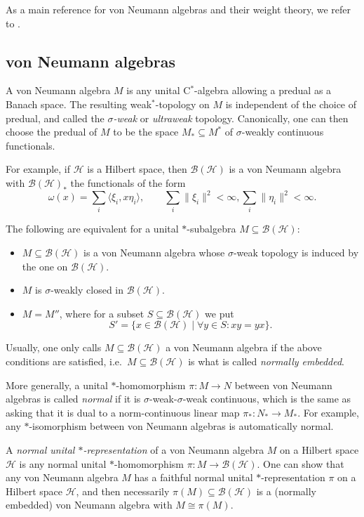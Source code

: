 \documentclass[11pt, reqno]{amsart}
\theoremstyle{definition}
\numberwithin{equation}{section}
\newcommand{\Hsp}{\mathcal{H}}
\newcommand{\Bc}{\mathcal{B}}
\begin{document}
As a main reference for von Neumann algebras and their weight theory, we refer to \cite{Tak02,Tak03}. 


\subsection{von Neumann algebras}

A von Neumann algebra $M$ is any unital C$^*$-algebra allowing a predual as a Banach space. The resulting weak$^*$-topology on $M$ is independent of the choice of predual, and called the \emph{$\sigma$-weak} or \emph{ultraweak} topology. Canonically, one can then choose the predual of $M$ to be the space $M_* \subseteq M^*$ of $\sigma$-weakly continuous functionals.

For example, if $\Hsp$ is a Hilbert space, then $\Bc(\Hsp)$ is a von Neumann algebra with $\Bc(\Hsp)_*$ the functionals of the form 
\[
\omega(x) = \sum_i \langle \xi_i,x\eta_i\rangle,\qquad \sum_i \|\xi_i\|^2 <\infty,\sum_i \|\eta_i\|^2 <\infty. 
\]

The following are equivalent for a unital $*$-subalgebra $M \subseteq \Bc(\Hsp)$: 
\begin{itemize}
\item $M \subseteq \Bc(\Hsp)$ is a von Neumann algebra whose $\sigma$-weak topology is induced by the one on $\Bc(\Hsp)$.
\item $M$ is $\sigma$-weakly closed in $\Bc(\Hsp)$. 
\item $M= M''$, where for a subset $S \subseteq \Bc(\Hsp)$ we put 
\[
S' = \{x\in \Bc(\Hsp)\mid \forall y\in S: xy = yx\}.
\]
\end{itemize}
Usually, one only calls $M \subseteq \Bc(\Hsp)$ a von Neumann algebra if the above conditions are satisfied, i.e.\ $M \subseteq \Bc(\Hsp)$ is what is called \emph{normally embedded}.  

More generally, a unital $*$-homomorphism $\pi\colon  M \rightarrow N$ between von Neumann algebras is called \emph{normal} if it is $\sigma$-weak-$\sigma$-weak continuous, which is the same as asking that it is dual to a norm-continuous linear map $\pi_*\colon  N_*\rightarrow M_*$. For example, any $*$-isomorphism between von Neumann algebras is automatically normal.

A \emph{normal unital $*$-representation} of a von Neumann algebra $M$ on a Hilbert space $\Hsp$ is any normal unital $*$-homomorphism $\pi\colon  M \rightarrow \Bc(\Hsp)$. One can show that any von Neumann algebra $M$ has a faithful normal unital $*$-representation $\pi$ on a Hilbert space $\Hsp$, and then necessarily $\pi(M) \subseteq \Bc(\Hsp)$ is a (normally embedded) von Neumann algebra with $M \cong \pi(M)$. 
\end{document}

